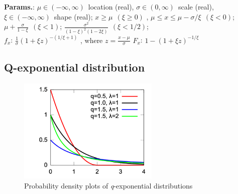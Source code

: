     {\color{darkblue} \textbf{Params.}:} {$\mu \in (-\infty,\infty) \,$ location (real),  $\sigma \in (0,\infty)    \,$ scale (real),  $\xi\in (-\infty,\infty)  \,$ shape (real)}; {$x \geqslant \mu\,\;(\xi \geqslant 0)$ ,  $\mu \leqslant x \leqslant \mu-\sigma/\xi\,\;(\xi < 0)$}; {$\mu + \frac{\sigma}{1-\xi}\, \; (\xi < 1) $}; {$\frac{\sigma^2}{(1-\xi)^2(1-2\xi)}\, \; (\xi < 1/2)$};\hspace{0.5cm}\\{\color{darkblue} \textbf{$f_x$}:} {$\frac{1}{\sigma}(1 + \xi z )^{-(1/\xi +1)} $ , 
where $z=\frac{x-\mu}{\sigma}$}{\color{darkblue} \textbf{$F_x$}:} {$1-(1+\xi z)^{-1/\xi} \,$}



    
        
\subsection{Q-exponential distribution}


    \begin{figure}[H]
        \centering
        \includegraphics[width=0.6\textwidth]{images/The Probability Density Function of q-exponential distribution.png}
        \caption{Probability density plots of \textit{q}-exponential distributions}
    \end{figure}




